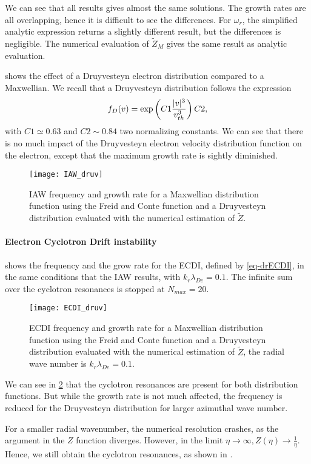   We can see that all results gives almost the same solutions.
  The growth rates are all overlapping, hence it is difficult to see the differences.
  For $\omega_r$, the simplified analytic expression returns a slightly different result, but the differences is negligible.
  The numerical evaluation of $\tilde{Z}_M$ gives the same result as analytic evaluation.
  
   shows the effect of a Druyvesteyn electron distribution compared to a Maxwellian.
  We recall that a Druyvesteyn distribution follows the expression
  \begin{equation} \label{eq-druyv}
    f_{D}(v) = \exp \left( C1 \frac{\lvert v\rvert^3}{v_{th}^3}  \right) C2,
  \end{equation}
  with $C1 \simeq 0.63$ and $C2 \sim 0.84$ two normalizing constants.
  We can see that there is no much impact of the Druyvesteyn electron velocity distribution function on the electron, except that the maximum growth rate is sightly diminished.
  
  \begin{figure}[hbtp]
    \centering
    \texttt{[image: IAW\_druv]}
    \caption{\ac{IAW} frequency and growth rate for a Maxwellian distribution function using the Freid and Conte function and a Druyvesteyn distribution evaluated with the numerical estimation of $\tilde{Z}$. }
    \label{fig-IAW_druv}
  \end{figure}
  
  \paragraph{Electron Cyclotron Drift instability\\}
  
     shows the frequency and the grow rate for the \ac{ECDI}, defined by \cref{eq-drECDI}, in the same conditions that the \ac{IAW} results, with $k_r \lambda_{De} = 0.1 $.
    The infinite sum over the cyclotron resonances is stopped at $N_{max} = 20$.
    
    
    \begin{figure}[hbtp]
    \centering
    \texttt{[image: ECDI\_druv]}
    \caption{\ac{ECDI} frequency and growth rate for a Maxwellian distribution function using the Freid and Conte function and a Druyvesteyn distribution evaluated with the numerical estimation of $\tilde{Z}$, the radial wave number is $k_r \lambda_{De} = 0.1 $.}
    \label{fig-ECDI_druv}
  \end{figure}
  
  We can see in \cref{fig-ECDI_druv} that the cyclotron resonances are present for both distribution functions.
  But while the growth rate is not much affected, the frequency is reduced for the Druyvesteyn distribution for larger azimuthal wave number.
  
  For a smaller radial wavenumber, the numerical resolution crashes, as the argument in the $Z$ function diverges.
  However, in the limit $\eta \rightarrow \infty, Z(\eta) \rightarrow  \frac{1}{\eta}$.
  Hence, we still obtain the cyclotron resonances, as shown in \citet[Fig. 2]{janhunen2018}.
  
  
\let\rightmark=\oldrightmark
